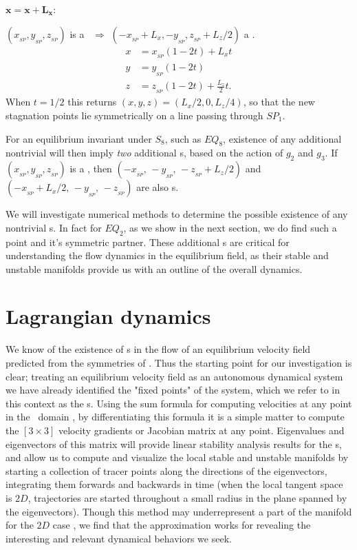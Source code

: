 \documentclass[letter,12pt,openany]{article}
\begin{document}
 \noindent$\mathbf{x = x + L_{x}}$:

 \noindent $(x_{_{SP}},y_{_{SP}},z_{_{SP}})$ is a \stagp\ $\Rightarrow$
 $(-x_{_{SP}}+L_{x},-y_{_{SP}},z_{_{SP}}+L_{z}/2)$ a \stagp.
 \begin{align}
  x &= x_{_{SP}}(1-2t) + L_{x}t \\
  y &= y_{_{SP}}(1-2t) \\
  z &= z_{_{SP}}(1-2t) + \frac{L_{z}}{2} t .
 \end{align}
When $t = 1/2$ this returns $(x,y,z) = (L_{x}/2,0,L_{z}/4)$, so that the 
new stagnation points lie symmetrically on a line passing through $SP_1$. 

For an equilibrium invariant under $S_8$, such as $EQ_8$, existence of 
any additional nontrivial {\stagp} will then imply \textit{two} 
additional {\stagp}s, based on the action of $g_2$ and $g_3$. 
 If $(x_{_{SP}},y_{_{SP}},z_{_{SP}})$ is a \stagp, then  
 $(-x_{_{SP}},\, -y_{_{SP}},\, -z_{_{SP}}+L_z/2)$ and 
 $(-x_{_{SP}} + L_x/2,\, -y_{_{SP}},\, -z_{_{SP}})$ are also \stagp s. 

We will investigate numerical methods to determine the possible existence 
of any nontrivial {\stagp}s. In fact for $EQ_2$, as we show in the next 
section, we do find such a point and it's symmetric partner. These 
additional {\stagp}s are critical for understanding the flow dynamics in 
the equilibrium field, as their stable and unstable manifolds provide us 
with an outline of the overall dynamics. 

\section{Lagrangian dynamics}
\label{s:Lagrangian}

We know of the existence of  \stagp s in the flow of an equilibrium 
velocity field predicted from the symmetries of \pCf. Thus the starting 
point for our investigation is clear; treating an equilibrium velocity 
field as an autonomous dynamical system we have already identified the 
"fixed points" of the system, which we refer to in this context as the 
\stagp s.  Using the sum formula for computing velocities at any point in 
the \pCf\ domain , by differentiating this formula 
it is a simple matter to compute the $[3\!\times\! 3]$ velocity gradients 
or Jacobian matrix at any point. Eigenvalues and eigenvectors of this 
matrix will provide linear stability analysis results for the {\stagp}s, 
and allow us to compute and visualize the local stable and unstable 
manifolds by starting a collection of tracer points along the directions 
of the eigenvectors, integrating them forwards and backwards in time 
(when the local tangent space is $2D$, trajectories are started 
throughout a small radius in the plane spanned by the eigenvectors). 
Though this method may underrepresent a part of the manifold for the $2D$ 
case \cite{SahVla09}, we find that the approximation works for revealing 
the interesting and relevant dynamical behaviors we seek. 
\end{document}
